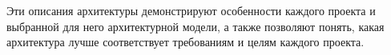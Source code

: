 Эти описания архитектуры демонстрируют особенности каждого проекта и выбранной для него архитектурной модели, а также позволяют понять, какая архитектура лучше соответствует требованиям и целям каждого проекта.





    

\clearpage